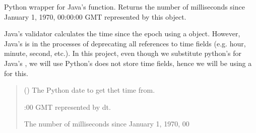 \documentclass[letterpaper,10pt,english]{sphinxmanual}
\begin{document}
\begin{fulllineitems}
\label{\detokenize{apache_commons_validator_python.util:apache_commons_validator_python.util.datetime_helpers.date_get_time}}
\pysigstartsignatures
{}
\pysigstopsignatures
\sphinxAtStartPar
Python wrapper for Java’s  function. Returns the number of
milliseconds since January 1, 1970, 00:00:00 GMT represented by this 
object.

\sphinxAtStartPar
{}
Java’s validator calculates the time since the epoch using a  object.
However, Java’s  is in the processes of deprecating all references to time fields (e.g. hour, minute, second, etc.).
In this project, even though we substitute python’s  for Java’s ,
we will use Python’s  does not store time fields, hence we will be using a  for this.
\begin{quote}\begin{description}
\sphinxAtStartPar
{} () \textendash{} The Python date to get thet time from.

:00 GMT represented by dt.

\sphinxAtStartPar
The number of milliseconds since January 1, 1970, 00

\end{description}\end{quote}

\end{fulllineitems}

\end{document}
